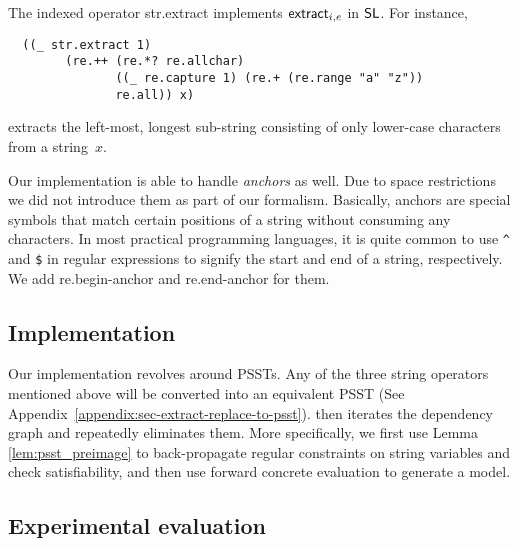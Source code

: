 The indexed operator {\sf str.extract} implements $\mathsf{extract}_{i, e}$ in
$\mathsf{SL}$. For instance,
%
\begin{verbatim}
  ((_ str.extract 1)
        (re.++ (re.*? re.allchar)
               ((_ re.capture 1) (re.+ (re.range "a" "z"))
               re.all)) x)
\end{verbatim}
%
extracts the left-most, longest sub-string consisting of only lower-case
characters from a string~$x$.

Our implementation is able to handle \textit{anchors} as well. Due to space restrictions we did not introduce them as part of our formalism. Basically, anchors are special symbols that match certain positions of a string without consuming any characters. In most practical programming languages, it is quite common to use \verb!^! and \verb!$! in regular expressions to signify the start and end of a string, respectively. We add \textsf{re.begin-anchor} and \textsf{re.end-anchor} for them.

\subsection{Implementation}

Our implementation revolves around PSSTs. Any of the three string operators mentioned above will be converted into an equivalent PSST (See Appendix~\ref{appendix:sec-extract-replace-to-psst}). {\ostrich} then iterates the dependency graph and repeatedly eliminates them. More specifically, we first use Lemma \ref{lem:psst_preimage} to back-propagate regular constraints on string variables and check satisfiability, and then use forward concrete evaluation to generate a model. 

\subsection{Experimental evaluation}

